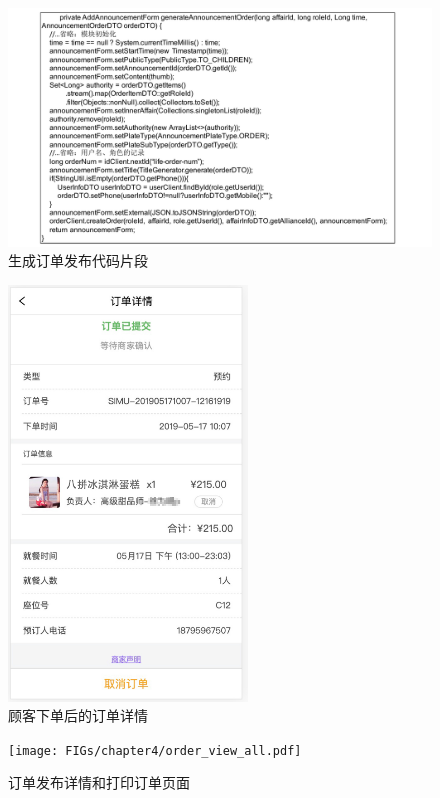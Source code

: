 \begin{figure}[htbp!]
    \centering
    \includegraphics[width=\linewidth]{FIGs/chapter4/1.pdf}
    \caption{生成订单发布代码片段}\label{fig_order_1}
\end{figure}

\begin{figure}[htbp!]
    \centering
    \includegraphics[width=2.5in]{FIGs/chapter4/order_view.pdf}
    \caption{顾客下单后的订单详情}\label{fig_order_view}
\end{figure}

\begin{figure}[htbp!]
    \centering
    \texttt{[image: FIGs/chapter4/order\_view\_all.pdf]}
    \caption{订单发布详情和打印订单页面}\label{fig_order_detail}
\end{figure}


